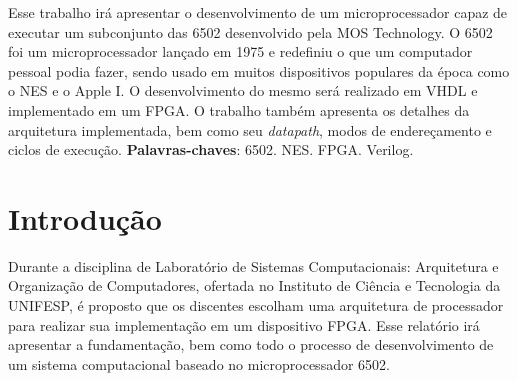 \documentclass[
	12pt,				  %
	openright,		%
	a4paper,			%
	english,			%
	french,				%
	spanish,			%
	brazil,				%
]{abntex2}
\begin{document}

\frenchspacing


\imprimircapa

\imprimirfolhaderosto*

\setlength{\absparsep}{18pt} %
\begin{resumo}
	Esse trabalho irá apresentar o desenvolvimento de um microprocessador capaz
	de executar um subconjunto das 6502 desenvolvido pela MOS Technology.
	O 6502 foi um microprocessador lançado em 1975 e redefiniu o que um computador
	pessoal podia fazer, sendo usado em muitos dispositivos populares da época
	como o NES e o Apple I. O desenvolvimento do mesmo será realizado em VHDL e
	implementado em um FPGA. O trabalho também apresenta os detalhes da arquitetura
	implementada, bem como seu \emph{datapath}, modos de endereçamento e ciclos de
	execução. \newline\newline
	\textbf{Palavras-chaves}: 6502. NES. FPGA. Verilog.
	\noindent
\end{resumo}



\listoffigures*
\clearpage

\listoftables*
\clearpage


\tableofcontents*


\textual

\chapter{Introdução}
Durante a disciplina de Laboratório de Sistemas Computacionais:
Arquitetura e Organização de Computadores, ofertada no Instituto de Ciência
e Tecnologia da UNIFESP, é proposto que os discentes
escolham uma arquitetura de processador para realizar sua implementação em um
dispositivo FPGA. Esse relatório irá apresentar a fundamentação, bem como todo
o processo de desenvolvimento de um sistema computacional baseado no
microprocessador 6502.
\end{document}

